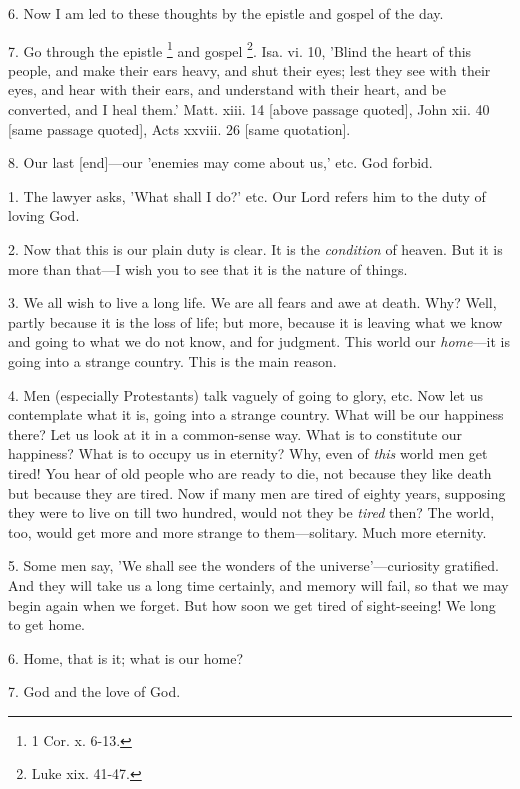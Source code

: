 6. Now I am led to these thoughts by the epistle
and gospel of the day.

7. Go through the epistle \footnote{1 Cor. x. 6-13.} and gospel \footnote{Luke xix. 41-47.}.
Isa. vi. 10, 'Blind the heart of this people, and make their ears
heavy, and shut their eyes; lest they see with their eyes, and hear
with their ears, and understand with their heart, and be converted,
and I heal them.' Matt. xiii. 14 [above passage quoted], John xii. 40
[same passage quoted], Acts xxviii. 26 [same quotation].

8. Our last [end]—our 'enemies may come about
us,' etc. God forbid.


1. The lawyer asks, 'What shall I do?' etc. Our
Lord refers him to the duty of loving God.

2. Now that this is our plain duty is clear. It
is the \emph{condition} of heaven. But it is more than that—I wish
you to see that it is the nature of things.

3. We all wish to live a long life. We are all
fears and awe at death. Why? Well, partly because it is the loss of
life; but more, because it is leaving what we know and going to what
we do not know, and for judgment. This world our \emph{home}—it is
going into a strange country. This is the main reason.

4. Men (especially Protestants) talk vaguely of
going to glory, etc. Now let us contemplate what it is, going into a
strange country. What will be our happiness there? Let us look at it
in a common-sense way. What is to constitute our happiness? What is to
occupy us in eternity? Why, even of \emph{this} world men get tired!
You hear of old people who are ready to die, not because they
like death but because they are tired. Now if many men are tired of
eighty years, supposing they were to live on till two hundred, would
not they be \emph{tired} then? The world, too, would get more and more
strange to them—solitary. Much more eternity.

5. Some men say, 'We shall see the wonders of the
universe'—curiosity gratified. And they will take us a long time
certainly, and memory will fail, so that we may begin again when we
forget. But how soon we get tired of sight-seeing! We long to get
home.

6. Home, that is it; what is our home?

7. God and the love of God.

